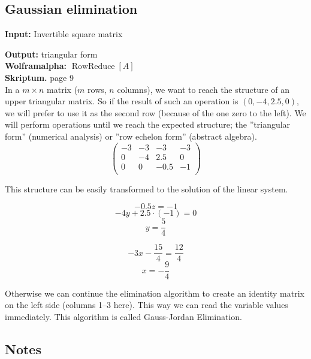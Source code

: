 \documentclass[a4paper,twocolumn]{article}
\newcommand{\io}[2]{{\par\noindent\textbf{Input:} #1 \\}{\textbf{Output:} #2 \\}}
\newcommand{\wa}[1]{\textbf{Wolframalpha:} $#1$ \\}
\newcommand{\scriptref}[1]{\textbf{Skriptum.} page #1 \\}
\begin{document}
\subsection{Gaussian elimination}
\io{Invertible square matrix}{triangular form}
\wa{\operatorname{RowReduce}[A]}
\scriptref{9}

In a $m\times n$ matrix ($m$ rows, $n$ columns), we want to reach
the structure of an upper triangular matrix. So if the result of such
an operation is $(0, -4, 2.5, 0)$, we will prefer to use it as the
second row (because of the one zero to the left). We will perform operations
until we reach the expected structure; the ''triangular form'' (numerical
analysis) or ''row echelon form'' (abstract algebra).
%
\[
    \left(\begin{array}{cccc}
        -3 & -3 &   -3 & -3 \\
        0  & -4 &  2.5 &  0 \\
        0  &  0 & -0.5 & -1 \\
    \end{array}\right)
\]

This structure can be easily transformed to the solution of the linear
system.
%
\begin{minipage}{0.2\textwidth}\[
    -0.5z = -1
\] \[
    -4y + 2.5 \cdot (-1) = 0
\] \[
    y = \frac54
\]
\end{minipage}\begin{minipage}{0.3\textwidth}
\[
    -3x - \frac{15}{4} = \frac{12}{4}
\] \[
    x = -\frac94
\]\end{minipage}

Otherwise we can continue the elimination algorithm to create an
identity matrix on the left side (columns 1--3 here). This way
we can read the variable values immediately. This algorithm is
called Gauss-Jordan Elimination.

\subsection{Notes}
\end{document}
